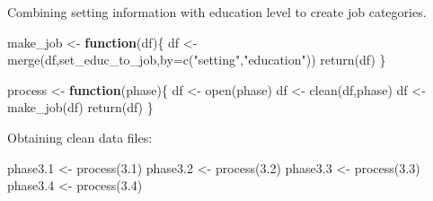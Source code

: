 \documentclass[
]{article}
\newenvironment{Shaded}{\begin{snugshade}}{\end{snugshade}}
\newcommand{\AttributeTok}[1]{\textcolor[rgb]{0.77,0.63,0.00}{#1}}
\newcommand{\ControlFlowTok}[1]{\textcolor[rgb]{0.13,0.29,0.53}{\textbf{#1}}}
\newcommand{\ErrorTok}[1]{\textcolor[rgb]{0.64,0.00,0.00}{\textbf{#1}}}
\newcommand{\FloatTok}[1]{\textcolor[rgb]{0.00,0.00,0.81}{#1}}
\newcommand{\FunctionTok}[1]{\textcolor[rgb]{0.00,0.00,0.00}{#1}}
\newcommand{\NormalTok}[1]{#1}
\newcommand{\OtherTok}[1]{\textcolor[rgb]{0.56,0.35,0.01}{#1}}
\newcommand{\SpecialCharTok}[1]{\textcolor[rgb]{0.00,0.00,0.00}{#1}}
\newcommand{\StringTok}[1]{\textcolor[rgb]{0.31,0.60,0.02}{#1}}
\begin{document}
\begin{Shaded}
\end{Shaded}

Combining setting information with education level to create job
categories.

\begin{Shaded}
\begin{Highlighting}[]
\NormalTok{make\_job }\OtherTok{\textless{}{-}} \ControlFlowTok{function}\NormalTok{(df)\{}
\NormalTok{  df }\OtherTok{\textless{}{-}} \FunctionTok{merge}\NormalTok{(df,set\_educ\_to\_job,}\AttributeTok{by=}\FunctionTok{c}\NormalTok{(}\StringTok{"setting"}\NormalTok{,}\StringTok{"education"}\NormalTok{))}
  \FunctionTok{return}\NormalTok{(df)}
\NormalTok{\}}
\end{Highlighting}
\end{Shaded}

\begin{Shaded}
\begin{Highlighting}[]
\NormalTok{process }\OtherTok{\textless{}{-}} \ControlFlowTok{function}\NormalTok{(phase)\{}
\NormalTok{  df }\OtherTok{\textless{}{-}} \FunctionTok{open}\NormalTok{(phase)}
\NormalTok{  df }\OtherTok{\textless{}{-}} \FunctionTok{clean}\NormalTok{(df,phase)}
\NormalTok{  df }\OtherTok{\textless{}{-}} \FunctionTok{make\_job}\NormalTok{(df)}
  \FunctionTok{return}\NormalTok{(df)}
\NormalTok{\}}
\end{Highlighting}
\end{Shaded}

Obtaining clean data files:

\begin{Shaded}
\begin{Highlighting}[]
\NormalTok{phase3}\FloatTok{.1} \OtherTok{\textless{}{-}} \FunctionTok{process}\NormalTok{(}\FloatTok{3.1}\NormalTok{)}
\NormalTok{phase3}\FloatTok{.2} \OtherTok{\textless{}{-}} \FunctionTok{process}\NormalTok{(}\FloatTok{3.2}\NormalTok{)}
\NormalTok{phase3}\FloatTok{.3} \OtherTok{\textless{}{-}} \FunctionTok{process}\NormalTok{(}\FloatTok{3.3}\NormalTok{)}
\NormalTok{phase3}\FloatTok{.4} \OtherTok{\textless{}{-}} \FunctionTok{process}\NormalTok{(}\FloatTok{3.4}\NormalTok{)}
\end{Highlighting}
\end{Shaded}
\end{document}
